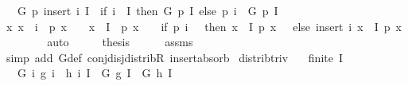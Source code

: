 \begin{isabellebody}
\ \ \ {\isachardoublequoteopen}G\ p\ {\isacharparenleft}{\kern0pt}insert\ i\ I{\isacharparenright}{\kern0pt}\ {\isacharequal}{\kern0pt}\ {\isacharparenleft}{\kern0pt}if\ i\ {\isasymin}\ I\ then\ G\ p\ I\ else\ p\ i\ \isactrlbold {\isacharasterisk}{\kern0pt}\ G\ p\ I{\isacharparenright}{\kern0pt}{\isachardoublequoteclose}\isanewline
%
\isadelimproof
%
\endisadelimproof
%
\isatagproof
{}\isamarkupfalse%
\ {\isacharminus}{\kern0pt}\isanewline
\ \ \isamarkupfalse%
\ {\isachardoublequoteopen}{\isacharbraceleft}{\kern0pt}x{\isachardot}{\kern0pt}\ x\ {\isacharequal}{\kern0pt}\ i\ {\isasymand}\ p\ x\ {\isasymnoteq}\ \ {\isasymor}\ x\ {\isasymin}\ I\ {\isasymand}\ p\ x\ {\isasymnoteq}\ \ {\isacharequal}{\kern0pt}\ {\isacharparenleft}{\kern0pt}if\ p\ i\ {\isacharequal}{\kern0pt}\ \ then\ {\isacharbraceleft}{\kern0pt}x\ {\isasymin}\ I{\isachardot}{\kern0pt}\ p\ x\ {\isasymnoteq}\ \ else\ insert\ i\ {\isacharbraceleft}{\kern0pt}x\ {\isasymin}\ I{\isachardot}{\kern0pt}\ p\ x\ {\isasymnoteq}\ \isanewline
\ \ \ \ \isamarkupfalse%
\ auto\isanewline
\ \ \isamarkupfalse%
\ \isamarkupfalse%
\ {\isacharquery}{\kern0pt}thesis\isanewline
\ \ \ \ \isamarkupfalse%
\ assms\ \isamarkupfalse%
\ {\isacharparenleft}{\kern0pt}simp\ add{\isacharcolon}{\kern0pt}\ G{\isacharunderscore}{\kern0pt}def\ conj{\isacharunderscore}{\kern0pt}disj{\isacharunderscore}{\kern0pt}distribR\ insert{\isacharunderscore}{\kern0pt}absorb{\isacharparenright}{\kern0pt}\isanewline
{}\isamarkupfalse%
%
\endisatagproof
{\isafoldproof}%
%
\isadelimproof
\isanewline
%
\endisadelimproof
\isanewline
{}\isamarkupfalse%
\ distrib{\isacharunderscore}{\kern0pt}triv{\isacharprime}{\kern0pt}{\isacharcolon}{\kern0pt}\isanewline
\ \ \ {\isachardoublequoteopen}finite\ I{\isachardoublequoteclose}\isanewline
\ \ \ {\isachardoublequoteopen}G\ {\isacharparenleft}{\kern0pt}{\isasymlambda}i{\isachardot}{\kern0pt}\ g\ i\ \isactrlbold {\isacharasterisk}{\kern0pt}\ h\ i{\isacharparenright}{\kern0pt}\ I\ {\isacharequal}{\kern0pt}\ G\ g\ I\ \isactrlbold {\isacharasterisk}{\kern0pt}\ G\ h\ I{\isachardoublequoteclose}\isanewline
%
\isadelimproof
\ \ %
\endisadelimproof

\end{isabellebody}
